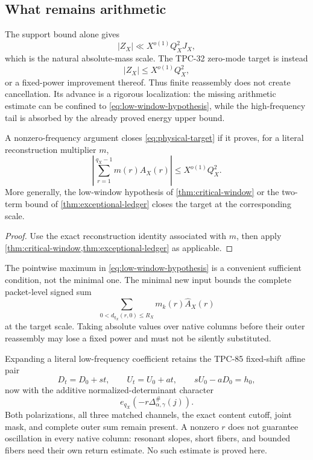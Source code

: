 \subsection{What remains arithmetic}

The support bound alone gives
\begin{equation}
 |Z_X|\ll X^{o(1)}Q_X^2J_X,
\label{eq:trivial-physical-scale}
\end{equation}
which is the natural absolute-mass scale.  The TPC-32 zero-mode target
is instead
\begin{equation}
 |Z_X|\le X^{o(1)}Q_X^2,
\label{eq:physical-target}
\end{equation}
or a fixed-power improvement thereof.  Thus finite reassembly does
not create cancellation.  Its advance is a rigorous localization:
the missing arithmetic estimate can be confined to
\eqref{eq:low-window-hypothesis}, while the high-frequency tail is
absorbed by the already proved energy upper bound.

\begin{corollary}
\label{cor:valid-fourier-advance}
A nonzero-frequency argument closes
\eqref{eq:physical-target} if it proves, for a literal reconstruction
multiplier \(m\),
\[
 \left|
 \sum_{r=1}^{q_X-1}m(r)\widehat A_X(r)
 \right|
 \le X^{o(1)}Q_X^2.
\]
More generally, the low-window hypothesis of
\cref{thm:critical-window} or the two-term bound of
\cref{thm:exceptional-ledger} closes the target at the corresponding
scale.
\end{corollary}

\begin{proof}
Use the exact reconstruction identity associated with \(m\), then
apply \cref{thm:critical-window,thm:exceptional-ledger} as applicable.
\end{proof}

\begin{remark}
The pointwise maximum in \eqref{eq:low-window-hypothesis} is a
convenient sufficient condition, not the minimal one.  The minimal
new input bounds the complete packet-level signed sum
\[
 \sum_{0<d_{q_X}(r,0)\le R_X}
 m_k(r)\widehat A_X(r)
\]
at the target scale.  Taking absolute values over native columns
before their outer reassembly may lose a fixed power and must not be
silently substituted.
\end{remark}

\begin{remark}
Expanding a literal low-frequency coefficient retains the TPC-85
fixed-shift affine pair
\[
 D_t=D_0+st,\qquad U_t=U_0+at,\qquad
 sU_0-aD_0=h_0,
\]
now with the additive normalized-determinant character
\[
 e_{q_X}\!\left(-r\Delta^\#_{\alpha,\gamma}(j)\right).
\]
Both polarizations, all three matched channels, the exact content
cutoff, joint mask, and complete outer sum remain present.  A nonzero
\(r\) does not guarantee oscillation in every native column:
resonant slopes, short fibers, and bounded fibers need their own
return estimate.  No such estimate is proved here.
\end{remark}

